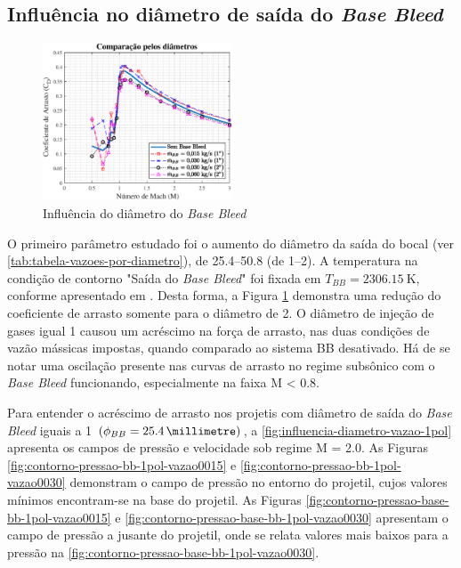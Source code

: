 \subsection{Influência no diâmetro de saída do \textit{Base Bleed}} \label{subsec:resultados-com-basebleed-diametros}

\begin{figure}[!htpb]
	\centering
    \includegraphics[width=0.5\textwidth]{cd-combasebleed-diametro-1e2pol.eps}
	\caption{Influência do diâmetro do \textit{Base Bleed}}
	\label{fig:comparacao-bb-diametro-1e2pol}
\end{figure}

O primeiro parâmetro estudado foi o aumento do diâmetro da saída do bocal (ver \autoref{tab:tabela-vazoes-por-diametro}), de \qtyrange{25,4}{50,8}{\millimetre} (de \qtyrange{1}{2}{\polegada}). A temperatura na condição de contorno "Saída do \textit{Base Bleed}"{} foi fixada em \(T_{BB} = \qty{2306,15}{\kelvin}\), conforme apresentado em \cite{Gil2020}. Desta forma, a Figura \ref{fig:comparacao-bb-diametro-1e2pol} demonstra uma redução do coeficiente de arrasto somente para o diâmetro de \qty{2}{\polegada}. O diâmetro de injeção de gases igual \qty{1}{\polegada} causou um acréscimo na força de arrasto, nas duas condições de vazão mássicas impostas, quando comparado ao sistema BB desativado. Há de se notar uma oscilação presente nas curvas de arrasto no regime subsônico com o \textit{Base Bleed} funcionando, especialmente na faixa M < \num{0,8}.

Para entender o acréscimo de arrasto nos projetis com diâmetro de saída do \textit{Base Bleed} iguais a \qty{1}{\polegada} \(\left(\phi_{BB} = \qty{25,4}{\millimetre}\right)\), a \autoref{fig:influencia-diametro-vazao-1pol} apresenta os campos de pressão e velocidade sob regime M = \num{2,0}. As Figuras \ref{fig:contorno-pressao-bb-1pol-vazao0015} e \ref{fig:contorno-pressao-bb-1pol-vazao0030} demonstram o campo de pressão no entorno do projetil, cujos valores mínimos encontram-se na base do projetil. As Figuras \ref{fig:contorno-pressao-base-bb-1pol-vazao0015} e \ref{fig:contorno-pressao-base-bb-1pol-vazao0030} apresentam o campo de pressão a jusante do projetil, onde se relata valores mais baixos para a pressão na \autoref{fig:contorno-pressao-base-bb-1pol-vazao0030}.  

